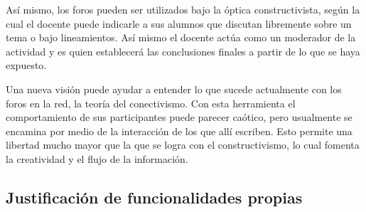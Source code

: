 Así mismo, los foros pueden ser utilizados bajo la óptica constructivista, según la cual el docente puede indicarle a sus alumnos que discutan libremente sobre un tema o bajo lineamientos. Así mismo el docente actúa como un moderador de la actividad y es quien establecerá las conclusiones finales a partir de lo que se haya expuesto.

Una nueva visión puede ayudar a entender lo que sucede actualmente con los foros en la red, la teoría del conectivismo. Con esta herramienta el comportamiento de sus participantes puede parecer caótico, pero usualmente se encamina por medio de la interacción de los que allí escriben. Esto permite una libertad mucho mayor que la que se logra con el constructivismo, lo cual fomenta la creatividad y el flujo de la información.

\subsection*{Justificación de funcionalidades propias}

